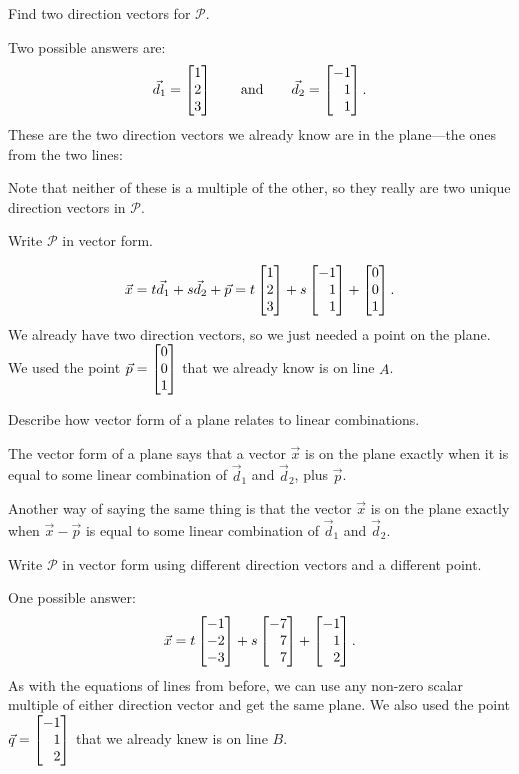 	\begin{parts}
		\item Find two direction vectors for $\mathcal P$.
			\begin{solution}
				Two possible answers are:
				\[
					\vec d_1 = \mat{1\\2\\3}
					\qquad \text{and} \qquad
					\vec d_2 = \mat{-1\\1\\1}.
				\]
				These are the two direction vectors we already know are in the
				plane---the ones from the two lines:

				Note that neither of these is a multiple of the other, so they
				really are two unique direction vectors in $\mathcal P$.
			\end{solution}
		\item Write $\mathcal P$ in vector form.
			\begin{solution}
				\[
					\vec x = t\vec d_1 +s\vec d_2+\vec p
					= t \mat{1\\2\\3} + s \mat{-1\\1\\1} + \mat{0\\0\\1}.
				\]
				We already have two direction vectors, so we just needed a point
				on the plane. We used the point $\vec p = \mat{0\\0\\1}$
				that we already know is on line $A$.
			\end{solution}
		\item Describe how vector form of a plane relates to linear
			combinations.
			\begin{solution}
				The vector form of a plane says that a vector $\vec x$ is on the
				plane exactly when it is equal to some linear combination of
				$\vec d_1$ and $\vec d_2$, plus $\vec p$.

				Another way of saying
				the same thing is that the vector $\vec x$ is on the plane
				exactly when $\vec x - \vec p$ is equal	to some linear
				combination of $\vec d_1$ and $\vec d_2$.
			\end{solution}
		\item Write $\mathcal P$ in vector form using different
			direction vectors and a different point.
			\begin{solution}
				One possible answer:
				\[
					\vec x = t\mat{-1\\-2\\-3}+s\mat{-7\\7\\7}+\mat{-1\\1\\2}.
				\]
				As with the equations of lines from before, we can use any
				non-zero scalar multiple of either direction vector and get the
				same plane. We also used the point $\vec q = \mat{-1\\1\\2}$
				that we already knew is on line $B$.
			\end{solution}
	\end{parts}

